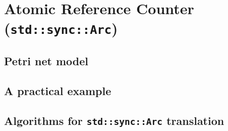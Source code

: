\section{Atomic Reference Counter (\texttt{std::sync::Arc})}

\subsection{Petri net model}

\subsection{A practical example}

\subsection{Algorithms for \texttt{std::sync::Arc} translation}